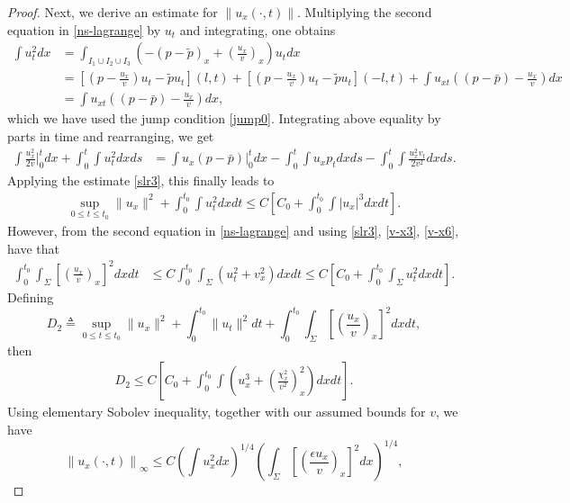 \documentclass[a4paper,oneside,11pt]{article}
\numberwithin{equation}{section}
\begin{document}
\begin{proof}
Next, we derive an estimate for \( \left\|u_{x}(\cdot, t)\right\| \). Multiplying the second equation in \eqref{ns-lagrange} by \( u_{t} \) and integrating, one obtains
\begin{align*}
\displaystyle  \int u_t^2 d x&=\int_{I_1\cup I_2\cup I_3}\left(-(p-\tilde p)_x+\left(\frac{u_x}{v}\right)_x\right) u_{t} d x\\
&=\left[(p-\frac{u_x}{v})u_t-\tilde p u_{t}\right](l,t)+\left[(p-\frac{u_x}{v})u_t-\tilde p u_{t}\right](-l,t)+\int u_{x t}\left((p-\bar p)-\frac{u_x}{v}\right) d x\\
&=\int u_{x t}\left((p-\bar p)-\frac{u_x}{v}\right) d x,
\end{align*}
which we have used the jump condition \eqref{jump0}. Integrating above equality by parts in time and rearranging, we get
\begin{align*}
\int \frac{u_x^2}{2 v}\Big|_0^td x+\int_0^t \int u_t^2 d x d s
&=\int u_x(p-\bar p)\Big|_0^t d x-\int_0^t \int u_x p_t d x d s-\int_0^t \int \frac{u_x^2v_t}{2 v^2}  d x d s.
\end{align*}
Applying the estimate \eqref{slr3}, this finally leads to
\begin{equation}\label{u-x1}
\begin{aligned}
\sup_{0 \leq t \leq t_0}\|u_x\|^2+ \int_0^{t_0}\int u_t^2dxdt\leq C\left[C_0 +\int_0^{t_0} \int|u_x|^3d x d t\right].
\end{aligned}
\end{equation}
However, from the second equation in \eqref{ns-lagrange} and using \eqref{slr3}, \eqref{v-x3}, \eqref{v-x6}, have that
\begin{align*}
\int_0^{t_0}\int_{\Sigma}\left[\left(\frac{u_x}{v}\right)_x\right]^2 d x d t &\leq C \int_0^{t_0}\int_{\Sigma}\left(u_t^2+v_x^2\right) d x d t\leq C\left[C_0+\int_0^{t_0}\int_{\Sigma} u_t^2 d x d t\right].
\end{align*}
Defining
\[
D_2\triangleq\sup_{0 \leq t \leq t_0} \|u_x\|^2 +\int_0^{t_0} \|u_t\|^2 d t+\int_0^{t_0} \int_{\Sigma}\left[\left(\frac{u_x}{v}\right)_x\right]^2 d x d t,
\]
then
\begin{equation}\label{u-x2}
\begin{aligned}
D_2\leq C\left[C_0+\int_0^{t_0} \int\left(u_x^3+\left(\frac{\chi_x^2}{v^2}\right)_x^2\right) d x d t\right].
\end{aligned}
\end{equation}
Using elementary Sobolev inequality, together with our assumed bounds for \( v \), we have
\[
\left\|u_x(\cdot, t)\right\|_{\infty} \leq C\left(\int u_x^2 d x\right)^{1/4}\left(\int_\Sigma\left[\left(\frac{\epsilon u_x}{v}\right)_x\right]^2 d x\right)^{1/4},
\]
\end{proof}
\end{document}
